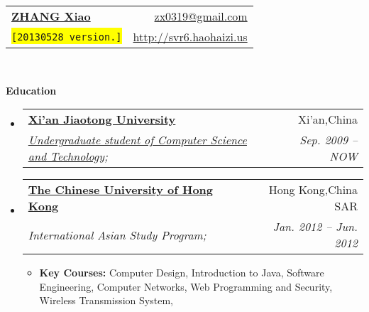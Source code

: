 \documentclass[letterpaper,11pt]{article}
\makeatletter
\newcommand{\resitem}[1]{\item #1 \vspace{-2pt}}
\newcommand{\resheading}[1]{{\large \colorbox{mygrey}{\begin{minipage}{\textwidth}{\textbf{#1 \vphantom{p\^{E}}}}\end{minipage}}}}
\newcommand{\ressubheading}[4]{
\begin{tabular*}{6.5in}{l@{\extracolsep{\fill}}r}
		\textbf{#1} & #2 \\
		\textit{#3} & \textit{#4} \\
\end{tabular*}\vspace{-6pt}}
\makeatother
\begin{document}
\newcommand{\mywebheader}{
\begin{tabular*}{7in}{l@{\extracolsep{\fill}}r}
	\textbf{\href{http://svr6.haohaizi.us/}{\LARGE ZHANG Xiao}} & \href{mailto:zx0319@gmail.com}{zx0319@gmail.com}\\
	{\footnotesize \texttt{\colorbox{yellow}{[20130528 version.]}}} & \href{http://svr6.haohaizi.us}{http://svr6.haohaizi.us} \\
	\end{tabular*}
\\
\vspace{0.1in}}

\mywebheader

\resheading{Education}
	\begin{itemize}
		\item
			\ressubheading{\href{http://www.xjtu.edu.cn}{Xi'an Jiaotong University}}{Xi'an,China}{\href{http://www.cs.xjtu.edu.cn}{Undergraduate student of Computer Science and Technology};}{Sep. 2009 --  NOW}
			
		\item
			\ressubheading{\href{http://www.cuhk.edu.hk}{The Chinese University of Hong Kong}}{Hong Kong,China SAR}{{International Asian Study Program};}{Jan. 2012 -- Jun. 2012}
				{ \footnotesize
				\begin{itemize}
					\resitem
					{\textbf{Key Courses:}
						{Computer Design},
						{Introduction to Java},
						{Software Engineering},
						{Computer Networks},
						{Web Programming and Security},
						{Wireless Transmission System},
					}
				\end{itemize}
			}
	\end{itemize} %
\end{document}
